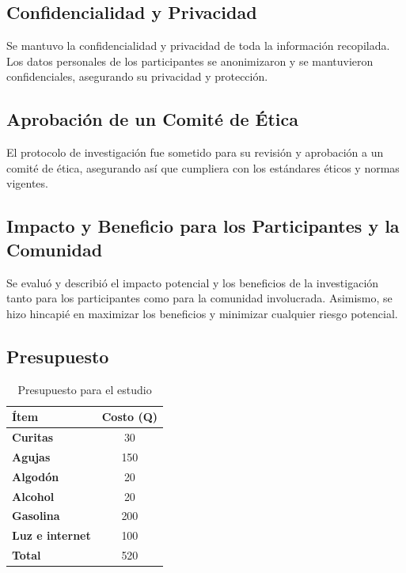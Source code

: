 \documentclass[jou]{apa7}
\begin{document}
	\subsection{Confidencialidad y Privacidad}\label{confidencialidad-y-privacidad}

	Se mantuvo la confidencialidad y privacidad de toda la información
	recopilada. Los datos personales de los participantes se anonimizaron y se
	mantuvieron confidenciales, asegurando su privacidad y
	protección.

	\subsection{Aprobación de un Comité de Ética}\label{aprobaciuxf3n-de-un-comituxe9-de-uxe9tica}

	El protocolo de investigación fue sometido para su revisión y
	aprobación a un comité de ética, asegurando así que cumpliera con los
	estándares éticos y normas vigentes.

	\subsection{Impacto y Beneficio para los Participantes y la Comunidad}\label{impacto-y-beneficio-para-los-participantes-y-la-comunidad}

	Se evaluó y describió el impacto potencial y los beneficios de la
	investigación tanto para los participantes como para la comunidad
	involucrada. Asimismo, se hizo hincapié en maximizar los beneficios y
	minimizar cualquier riesgo potencial.

	\subsection{Presupuesto}\label{presupuesto}

	\begin{table}[H]
		\centering
		\begin{tabular}{>{\bfseries}l c}
			\toprule
			Ítem & Costo (Q) \\

			\midrule
			Curitas & 30 \\

			Agujas & 150 \\

			Algodón & 20 \\

			Alcohol & 20 \\

			Gasolina & 200 \\

			Luz e internet & 100 \\

			\midrule
			Total & 520 \\

			\bottomrule
		\end{tabular}
		\caption{Presupuesto para el estudio}
		\label{tab:presupuesto}
	\end{table}
\end{document}

